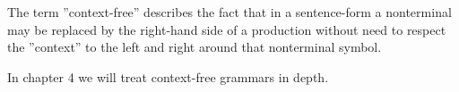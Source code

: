 The term ''context-free'' describes the fact that in a sentence-form a
nonterminal may be replaced by the right-hand side of a production without need
to respect the ''context'' to the left and right around that nonterminal symbol.

In chapter 4 we will treat context-free grammars in depth.





























